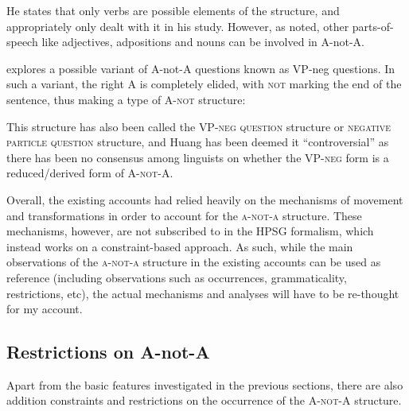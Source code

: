 \documentclass[12pt, UTF8]{article}
\begin{document}
He states that only verbs are possible elements of the structure, and appropriately only dealt with it in his study. However, as noted, other parts-of-speech like adjectives, adpositions and nouns can be involved in A-not-A. 


\cite{Huang2008} explores a possible variant of A-not-A questions known as VP-neg questions. In such a variant, the right \textsc{A} is completely elided, with \textsc{not} marking the end of the sentence, thus making a type of \textsc{A-not} structure:

\begin{exe}

\end{exe}

This structure has also been called the \textsc{VP-neg question} structure or \textsc{negative particle question} structure, and Huang has been deemed it ``controversial'' as there has been no consensus among linguists on whether the \textsc{VP-neg} form is a reduced/derived form of \textsc{A-not-A}.

Overall, the existing accounts had relied heavily on the mechanisms of movement and transformations in order to account for the \textsc{a-not-a} structure. These mechanisms, however, are not subscribed to in the HPSG formalism, which instead works on a constraint-based approach. As such, while the main observations of the \textsc{a-not-a} structure in the existing accounts can be used as reference (including observations such as occurrences, grammaticality, restrictions, etc), the actual mechanisms and analyses will have to be re-thought for my account.

\subsection{Restrictions on A-not-A}

Apart from the basic features investigated in the previous sections, there are also addition constraints and restrictions on the occurrence of the \textsc{A-not-A} structure.
\end{document}
